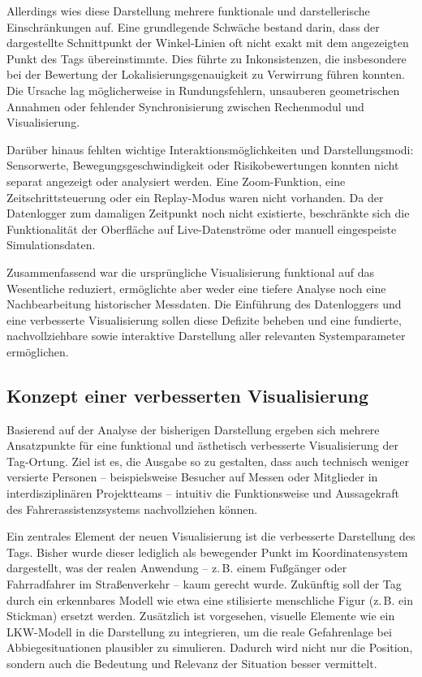 \documentclass[a4paper, 12pt]{article} %
\begin{document}
Allerdings wies diese Darstellung mehrere funktionale und darstellerische Einschränkungen auf. Eine grundlegende Schwäche bestand darin, dass der 
dargestellte Schnittpunkt der Winkel-Linien oft nicht exakt mit dem angezeigten Punkt des Tags übereinstimmte. Dies führte zu Inkonsistenzen, die 
insbesondere bei der Bewertung der Lokalisierungsgenauigkeit zu Verwirrung führen konnten. Die Ursache lag möglicherweise in Rundungsfehlern, unsauberen
 geometrischen Annahmen oder fehlender Synchronisierung zwischen Rechenmodul und Visualisierung.

Darüber hinaus fehlten wichtige Interaktionsmöglichkeiten und Darstellungsmodi: Sensorwerte, Bewegungsgeschwindigkeit oder Risikobewertungen konnten 
nicht separat angezeigt oder analysiert werden. Eine Zoom-Funktion, eine Zeitschrittsteuerung oder ein Replay-Modus waren nicht vorhanden. Da der 
Datenlogger zum damaligen Zeitpunkt noch nicht existierte, beschränkte sich die Funktionalität der Oberfläche auf Live-Datenströme oder manuell 
eingespeiste Simulationsdaten.

Zusammenfassend war die ursprüngliche Visualisierung funktional auf das Wesentliche reduziert, ermöglichte aber weder eine tiefere Analyse noch eine 
Nachbearbeitung historischer Messdaten. Die Einführung des Datenloggers und eine verbesserte Visualisierung sollen diese Defizite beheben und eine 
fundierte, nachvollziehbare sowie interaktive Darstellung aller relevanten Systemparameter ermöglichen.

\subsection{Konzept einer verbesserten Visualisierung}

Basierend auf der Analyse der bisherigen Darstellung ergeben sich mehrere Ansatzpunkte für eine funktional und ästhetisch verbesserte Visualisierung
 der Tag-Ortung. Ziel ist es, die Ausgabe so zu gestalten, dass auch technisch weniger versierte Personen – beispielsweise Besucher auf Messen oder 
 Mitglieder in interdisziplinären Projektteams – intuitiv die Funktionsweise und Aussagekraft des Fahrerassistenzsystems nachvollziehen können.

Ein zentrales Element der neuen Visualisierung ist die verbesserte Darstellung des Tags. Bisher wurde dieser lediglich als bewegender Punkt im 
Koordinatensystem dargestellt, was der realen Anwendung – z.\,B. einem Fußgänger oder Fahrradfahrer im Straßenverkehr – kaum gerecht wurde. Zukünftig 
soll der Tag durch ein erkennbares Modell wie etwa eine stilisierte menschliche Figur (z.\,B. ein Stickman) ersetzt werden. Zusätzlich ist vorgesehen,
 visuelle Elemente wie ein LKW-Modell in die Darstellung zu integrieren, um die reale Gefahrenlage bei Abbiegesituationen plausibler zu simulieren. 
 Dadurch wird nicht nur die Position, sondern auch die Bedeutung und Relevanz der Situation besser vermittelt.
\end{document}
